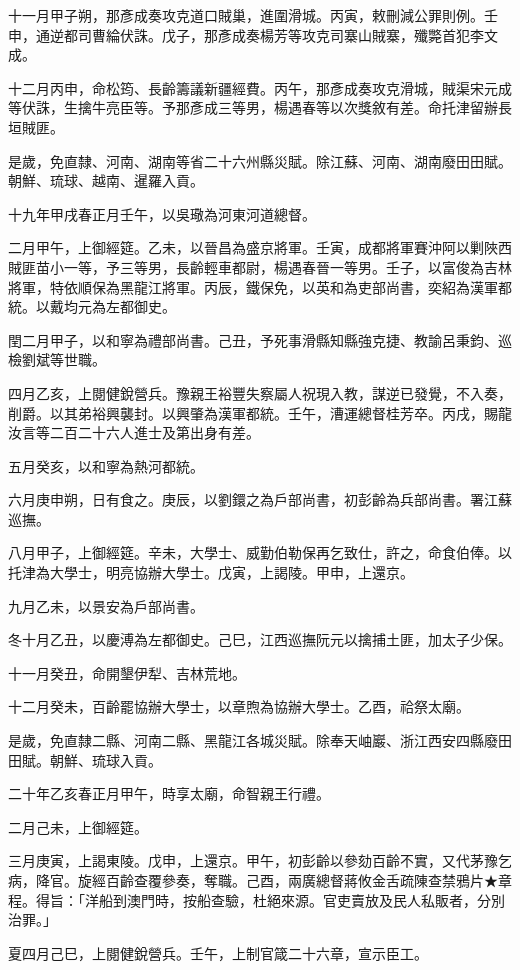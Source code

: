 \begin{pinyinscope}
十一月甲子朔，那彥成奏攻克道口賊巢，進圍滑城。丙寅，敕刪減公罪則例。壬申，通逆都司曹綸伏誅。戊子，那彥成奏楊芳等攻克司寨山賊寨，殲斃首犯李文成。

十二月丙申，命松筠、長齡籌議新疆經費。丙午，那彥成奏攻克滑城，賊渠宋元成等伏誅，生擒牛亮臣等。予那彥成三等男，楊遇春等以次獎敘有差。命托津留辦長垣賊匪。

是歲，免直隸、河南、湖南等省二十六州縣災賦。除江蘇、河南、湖南廢田田賦。朝鮮、琉球、越南、暹羅入貢。

十九年甲戌春正月壬午，以吳璥為河東河道總督。

二月甲午，上御經筵。乙未，以晉昌為盛京將軍。壬寅，成都將軍賽沖阿以剿陜西賊匪苗小一等，予三等男，長齡輕車都尉，楊遇春晉一等男。壬子，以富俊為吉林將軍，特依順保為黑龍江將軍。丙辰，鐵保免，以英和為吏部尚書，奕紹為漢軍都統。以戴均元為左都御史。

閏二月甲子，以和寧為禮部尚書。己丑，予死事滑縣知縣強克捷、教諭呂秉鈞、巡檢劉斌等世職。

四月乙亥，上閱健銳營兵。豫親王裕豐失察屬人祝現入教，謀逆已發覺，不入奏，削爵。以其弟裕興襲封。以興肇為漢軍都統。壬午，漕運總督桂芳卒。丙戌，賜龍汝言等二百二十六人進士及第出身有差。

五月癸亥，以和寧為熱河都統。

六月庚申朔，日有食之。庚辰，以劉鐶之為戶部尚書，初彭齡為兵部尚書。署江蘇巡撫。

八月甲子，上御經筵。辛未，大學士、威勤伯勒保再乞致仕，許之，命食伯俸。以托津為大學士，明亮協辦大學士。戊寅，上謁陵。甲申，上還京。

九月乙未，以景安為戶部尚書。

冬十月乙丑，以慶溥為左都御史。己巳，江西巡撫阮元以擒捕土匪，加太子少保。

十一月癸丑，命開墾伊犁、吉林荒地。

十二月癸未，百齡罷協辦大學士，以章煦為協辦大學士。乙酉，祫祭太廟。

是歲，免直隸二縣、河南二縣、黑龍江各城災賦。除奉天岫巖、浙江西安四縣廢田田賦。朝鮮、琉球入貢。

二十年乙亥春正月甲午，時享太廟，命智親王行禮。

二月己未，上御經筵。

三月庚寅，上謁東陵。戊申，上還京。甲午，初彭齡以參劾百齡不實，又代茅豫乞病，降官。旋經百齡查覆參奏，奪職。己酉，兩廣總督蔣攸金舌疏陳查禁鴉片★章程。得旨：「洋船到澳門時，按船查驗，杜絕來源。官吏賣放及民人私販者，分別治罪。」

夏四月己巳，上閱健銳營兵。壬午，上制官箴二十六章，宣示臣工。


\end{pinyinscope}
